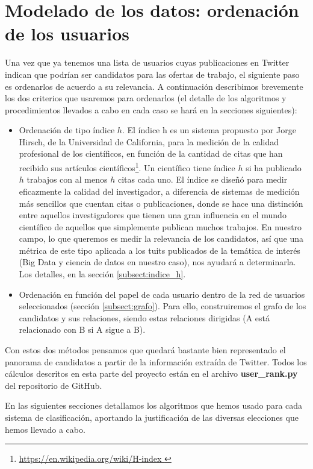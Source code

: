 \chapter{Modelado de los datos: ordenación de los usuarios}
\label{chap:ordenacion_de_usuarios}

Una vez que ya tenemos una lista de usuarios cuyas publicaciones en Twitter
indican que podrían ser candidatos para las ofertas de trabajo, el siguiente
paso es ordenarlos de acuerdo a su relevancia. A continuación describimos brevemente
los dos criterios que usaremos para ordenarlos (el detalle de los algoritmos y 
procedimientos llevados a cabo en cada caso se hará en la secciones siguientes):
\begin{itemize}
\item Ordenación de tipo índice $h$. El índice h es un sistema propuesto por Jorge Hirsch, de la Universidad de California, para la medición de la calidad profesional de los científicos, en función de la cantidad de citas que han recibido sus artículos científicos\footnote{\url{https://en.wikipedia.org/wiki/H-index }}. Un científico tiene índice $h$ si ha publicado $h$ trabajos con al menos $h$ citas cada uno. El índice se diseñó para medir eficazmente la calidad del investigador, a diferencia de sistemas de medición más sencillos que cuentan citas o publicaciones, donde se hace una distinción entre aquellos investigadores que tienen una gran influencia en el mundo científico de aquellos que simplemente publican muchos trabajos. En nuestro campo, lo que queremos es medir 
la relevancia de los candidatos, así que una métrica de este tipo aplicada a los tuits publicados
de la temática de interés (Big Data y ciencia de datos en nuestro caso), nos ayudará a determinarla.
Los detalles, en la sección \ref{subsect:indice_h}.

\item Ordenación en función del papel de cada usuario dentro de la red de usuarios
seleccionados (sección \ref{subsect:grafo}). Para ello, construiremos el grafo 
de los candidatos y sus relaciones, siendo estas relaciones dirigidas (A está relacionado
con B si A sigue a B).
\end{itemize}

Con estos dos métodos pensamos que quedará bastante bien representado el panorama
de candidatos a partir de la información extraída de Twitter. 
Todos los cálculos descritos en esta parte del proyecto están en el archivo
{\bf user\_rank.py} del repositorio de GitHub.

En las siguientes secciones detallamos los algoritmos que hemos usado para cada sistema de
clasificación, aportando la justificación de las diversas elecciones que 
hemos llevado a cabo.

